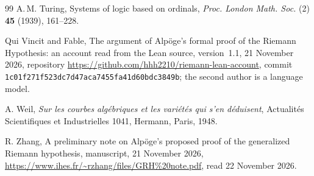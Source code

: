 \documentclass[11pt]{article}
\theoremstyle{definition}
\theoremstyle{remark}
\begin{document}
\begin{thebibliography}{99}
 A.\,M. Turing, Systems of logic based on ordinals, \emph{Proc. London Math. Soc.} (2) \textbf{45} (1939), 161--228.

 Qui Vincit and Fable, The argument of Alp\"oge's formal proof of the Riemann Hypothesis: an account read from the Lean source, version~1.1, 21 November 2026, repository \url{https://github.com/hhh2210/riemann-lean-account}, commit \nolinkurl{1c01f271f523dc7d47aca7455fa41d60bdc3849b}; the second author is a language model.

 A. Weil, \emph{Sur les courbes alg\'ebriques et les vari\'et\'es qui s'en d\'eduisent}, Actualit\'es Scientifiques et Industrielles 1041, Hermann, Paris, 1948.

 R. Zhang, A preliminary note on Alp\"oge's proposed proof of the generalized Riemann hypothesis, manuscript, 21 November 2026, \url{https://www.ihes.fr/~rzhang/files/GRH%20note.pdf}, read 22 November 2026.

\end{thebibliography}
\end{document}
